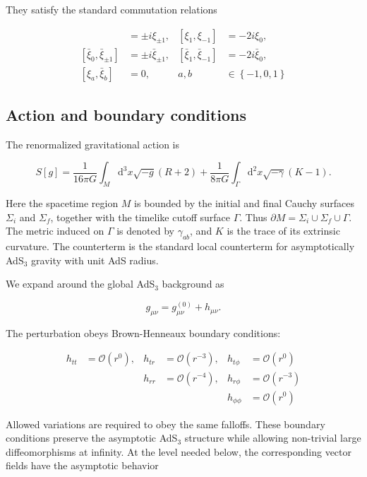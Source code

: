 They satisfy the standard commutation relations

\begin{align}
[\xi_0,\xi_{\pm1}]&=\pm i\xi_{\pm1},&
[\xi_1,\xi_{-1}]&=-2i\xi_0,\\
[\bar{\xi}_0,\bar{\xi}_{\pm1}]&=\pm i\bar{\xi}_{\pm1},&
[\bar{\xi}_1,\bar{\xi}_{-1}]&=-2i\bar{\xi}_0,\\
[\xi_a,\bar{\xi}_b]&=0, & a,b & \in\left\{-1,0,1\right\}
\end{align}

\subsection{Action and boundary conditions}\label{action-and-boundary-conditions}

The renormalized gravitational action is

\[
S[g]=\frac{1}{16\pi G}\int_M\mathrm{d}^3x\sqrt{-g}(R+2)
+\frac{1}{8\pi G}\int_\Gamma\mathrm{d}^2x\sqrt{-\gamma}(K-1).
\]

Here the spacetime region \(M\) is bounded by the initial and final Cauchy surfaces \(\Sigma _{i}\) and \(\Sigma _{f}\), together with the timelike cutoff surface \(\Gamma\). Thus \(\partial M=\Sigma_i\cup\Sigma_f\cup\Gamma\). The metric induced on \(\Gamma\) is denoted by \(\gamma_{ab}\), and \(K\) is the trace of its extrinsic curvature. The counterterm is the standard local counterterm for asymptotically AdS\(_3\) gravity with unit AdS radius.

We expand around the global AdS\(_3\) background as

\[
g_{\mu\nu}=g^{(0)}_{\mu\nu}+h_{\mu\nu}.
\]

The perturbation obeys Brown-Henneaux boundary conditions:

\begin{align}
h_{tt} & =\mathcal{O}(r^{0}), & h_{tr} & =\mathcal{O}(r^{-3}), & h_{t\phi} & =\mathcal{O}(r^{0}) \\
 & & h_{rr} & =\mathcal{O}(r^{-4}), & h_{r\phi} & =\mathcal{O}(r^{-3}) \\
 &  &  &  & h_{\phi \phi} & =\mathcal{O}(r^{0})
\end{align}

Allowed variations are required to obey the same falloffs. These boundary conditions preserve the asymptotic AdS\(_3\) structure while allowing non-trivial large diffeomorphisms at infinity. At the level needed below, the corresponding vector fields have the asymptotic behavior


